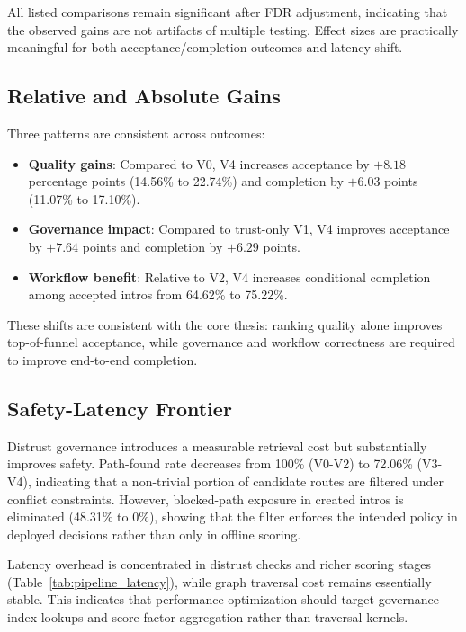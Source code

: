 \documentclass[conference]{IEEEtran}
\begin{document}
All listed comparisons remain significant after FDR adjustment, indicating that the observed gains are not artifacts of multiple testing. Effect sizes are practically meaningful for both acceptance/completion outcomes and latency shift.

\subsection{Relative and Absolute Gains}
Three patterns are consistent across outcomes:
\begin{itemize}
    \item \textbf{Quality gains}: Compared to V0, V4 increases acceptance by $+8.18$ percentage points (14.56\% to 22.74\%) and completion by $+6.03$ points (11.07\% to 17.10\%).
    \item \textbf{Governance impact}: Compared to trust-only V1, V4 improves acceptance by $+7.64$ points and completion by $+6.29$ points.
    \item \textbf{Workflow benefit}: Relative to V2, V4 increases conditional completion among accepted intros from 64.62\% to 75.22\%.
\end{itemize}

These shifts are consistent with the core thesis: ranking quality alone improves top-of-funnel acceptance, while governance and workflow correctness are required to improve end-to-end completion.

\subsection{Safety-Latency Frontier}
Distrust governance introduces a measurable retrieval cost but substantially improves safety. Path-found rate decreases from 100\% (V0-V2) to 72.06\% (V3-V4), indicating that a non-trivial portion of candidate routes are filtered under conflict constraints. However, blocked-path exposure in created intros is eliminated (48.31\% to 0\%), showing that the filter enforces the intended policy in deployed decisions rather than only in offline scoring.

Latency overhead is concentrated in distrust checks and richer scoring stages (Table~\ref{tab:pipeline_latency}), while graph traversal cost remains essentially stable. This indicates that performance optimization should target governance-index lookups and score-factor aggregation rather than traversal kernels.
\end{document}
